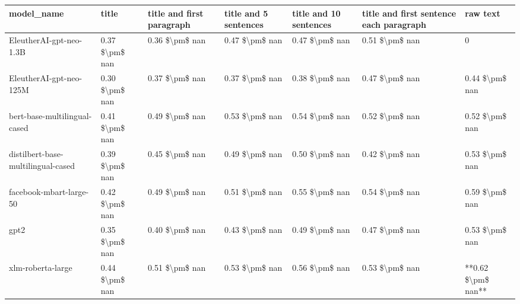 \begin{tabular}{lllllll}
\toprule
                        model\_name &          title & title and first paragraph & title and 5 sentences & title and 10 sentences & title and first sentence each paragraph &           raw text \\
\midrule
           EleutherAI-gpt-neo-1.3B & 0.37 \$\textbackslash pm\$ nan &            0.36 \$\textbackslash pm\$ nan &        0.47 \$\textbackslash pm\$ nan &         0.47 \$\textbackslash pm\$ nan &                          0.51 \$\textbackslash pm\$ nan &                  0 \\
           EleutherAI-gpt-neo-125M & 0.30 \$\textbackslash pm\$ nan &            0.37 \$\textbackslash pm\$ nan &        0.37 \$\textbackslash pm\$ nan &         0.38 \$\textbackslash pm\$ nan &                          0.47 \$\textbackslash pm\$ nan &     0.44 \$\textbackslash pm\$ nan \\
      bert-base-multilingual-cased & 0.41 \$\textbackslash pm\$ nan &            0.49 \$\textbackslash pm\$ nan &        0.53 \$\textbackslash pm\$ nan &         0.54 \$\textbackslash pm\$ nan &                          0.52 \$\textbackslash pm\$ nan &     0.52 \$\textbackslash pm\$ nan \\
distilbert-base-multilingual-cased & 0.39 \$\textbackslash pm\$ nan &            0.45 \$\textbackslash pm\$ nan &        0.49 \$\textbackslash pm\$ nan &         0.50 \$\textbackslash pm\$ nan &                          0.42 \$\textbackslash pm\$ nan &     0.53 \$\textbackslash pm\$ nan \\
           facebook-mbart-large-50 & 0.42 \$\textbackslash pm\$ nan &            0.49 \$\textbackslash pm\$ nan &        0.51 \$\textbackslash pm\$ nan &         0.55 \$\textbackslash pm\$ nan &                          0.54 \$\textbackslash pm\$ nan &     0.59 \$\textbackslash pm\$ nan \\
                              gpt2 & 0.35 \$\textbackslash pm\$ nan &            0.40 \$\textbackslash pm\$ nan &        0.43 \$\textbackslash pm\$ nan &         0.49 \$\textbackslash pm\$ nan &                          0.47 \$\textbackslash pm\$ nan &     0.53 \$\textbackslash pm\$ nan \\
                 xlm-roberta-large & 0.44 \$\textbackslash pm\$ nan &            0.51 \$\textbackslash pm\$ nan &        0.53 \$\textbackslash pm\$ nan &         0.56 \$\textbackslash pm\$ nan &                          0.53 \$\textbackslash pm\$ nan & **0.62 \$\textbackslash pm\$ nan** \\
\bottomrule
\end{tabular}

